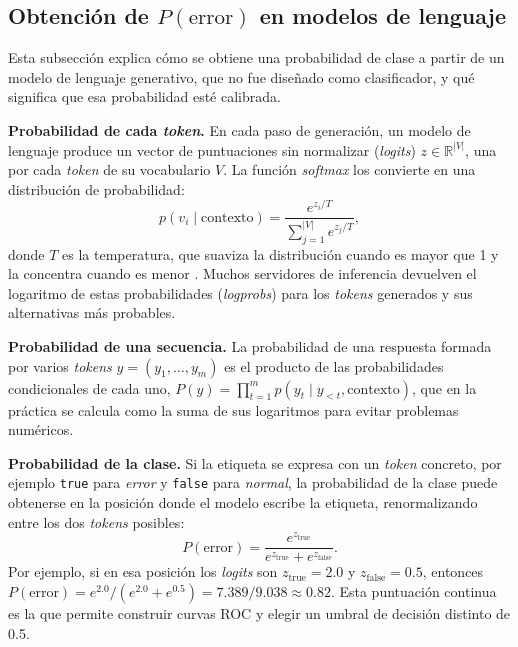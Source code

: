 \subsection{Obtención de $P(\text{error})$ en modelos de lenguaje}\label{sec:mt_probabilidad}

Esta subsección explica cómo se obtiene una probabilidad de clase a partir de un modelo de lenguaje generativo, que no fue diseñado como clasificador, y qué significa que esa probabilidad esté calibrada.

\textbf{Probabilidad de cada \textit{token}.} En cada paso de generación, un modelo de lenguaje produce un vector de puntuaciones sin normalizar (\textit{logits}) $z \in \mathbb{R}^{|V|}$, una por cada \textit{token} de su vocabulario $V$. La función \textit{softmax} los convierte en una distribución de probabilidad:
\begin{equation}
p(v_i \mid \text{contexto}) = \frac{e^{z_i / T}}{\sum_{j=1}^{|V|} e^{z_j / T}},
\end{equation}
donde $T$ es la temperatura, que suaviza la distribución cuando es mayor que 1 y la concentra cuando es menor \cite{yang2025_lightweight}. Muchos servidores de inferencia devuelven el logaritmo de estas probabilidades (\textit{logprobs}) para los \textit{tokens} generados y sus alternativas más probables.

\textbf{Probabilidad de una secuencia.} La probabilidad de una respuesta formada por varios \textit{tokens} $y = (y_1, \ldots, y_m)$ es el producto de las probabilidades condicionales de cada uno, $P(y) = \prod_{t=1}^{m} p(y_t \mid y_{<t}, \text{contexto})$, que en la práctica se calcula como la suma de sus logaritmos para evitar problemas numéricos.

\textbf{Probabilidad de la clase.} Si la etiqueta se expresa con un \textit{token} concreto, por ejemplo \texttt{true} para \emph{error} y \texttt{false} para \emph{normal}, la probabilidad de la clase puede obtenerse en la posición donde el modelo escribe la etiqueta, renormalizando entre los dos \textit{tokens} posibles:
\begin{equation}
P(\text{error}) = \frac{e^{z_{\text{true}}}}{e^{z_{\text{true}}} + e^{z_{\text{false}}}}.
\end{equation}
Por ejemplo, si en esa posición los \textit{logits} son $z_{\text{true}} = 2.0$ y $z_{\text{false}} = 0.5$, entonces $P(\text{error}) = e^{2.0}/(e^{2.0} + e^{0.5}) = 7.389/9.038 \approx 0.82$. Esta puntuación continua es la que permite construir curvas ROC y elegir un umbral de decisión distinto de 0.5.

